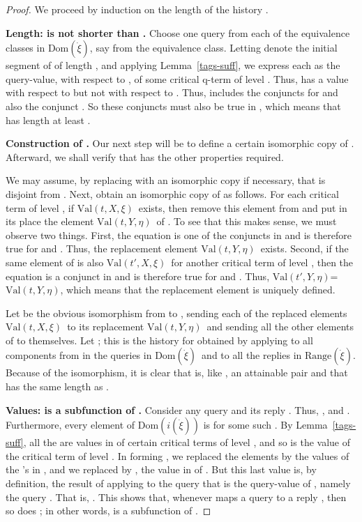 \documentclass{LMCS}
\theoremstyle{definition}
\newcommand{\ans}{\dot}
\newcommand{\dom}[1]{\ensuremath{{\text{Dom}}(#1)}}
\newcommand{\ran}[1]{\ensuremath{{\text{Range}}(#1)}}
\newcommand{\val}[3]{\ensuremath{\text{Val}(#1,#2,#3)}}
\begin{document}
\begin{proof}
We proceed by induction on the length  of the history .

\smallskip\noindent\textbf{Length:  is not shorter than .}
Choose one query from each of the  equivalence classes in
\dom{\ans\xi}, say  from the  equivalence class.  Letting
 denote the initial segment of  of length , and
applying Lemma~\ref{tags-suff}, we express each  as the query-value,
with respect to , of some critical q-term  of level
.  Thus,  has a value  with respect to
 but not with respect to .  Thus,
 includes the conjuncts  for
 and also the conjunct .  So these conjuncts
must also be true in , which means that  has length at
least .

\medskip\noindent\textbf{Construction of .} Our next
step will be to define a certain isomorphic copy  of
.  Afterward, we shall verify that  has the other
properties required.

 We may assume, by replacing  with an isomorphic copy if
necessary, that  is disjoint from .  Next, obtain an isomorphic
copy  of  as follows.  For each critical term  of level , if \val tX\xi\ exists, then remove this element from  and put
in its place the element \val tY\eta\ of .  To see that this makes
sense, we must observe two things.  First, the equation  is one
of the conjuncts in  and is therefore true for  and
.  Thus, the replacement element \val tY\eta\ exists.  Second,
if the same element of  is also \val{t'}X\xi\ for another critical
term  of level , then the equation  is a conjunct in
 and is therefore true for  and .  Thus,
\val{t'}Y\eta=\val tY\eta, which means that the replacement element is
uniquely defined.

Let  be the obvious isomorphism from  to , sending each of
the replaced elements \val tX\xi\ to its replacement \val tY\eta\ and
sending all the other elements of  to themselves.  Let
; this is the history for  obtained by applying  to
all components from  in the queries in \dom{\ans\xi}\ and to all the
replies in \ran{\ans\xi}.  Because of the isomorphism, it is clear
that  is, like , an attainable pair and that
 has the same length  as .

\medskip\noindent\textbf{Values:  is a subfunction of .}  Consider any query 
and its reply .  Thus, , and
.  Furthermore, every element of
\dom{i(\ans\xi)} is  for some such .  By
Lemma~\ref{tags-suff}, all the  are values in  of
certain critical terms  of level , and so  is the value of
the critical term  of level .  In forming
, we replaced the elements  by the values  of the
's in , and we replaced  by , the value in
 of .  But this last value is, by
definition, the result of applying  to the query that is the
query-value of , namely the query .  That is, .  This
shows that, whenever  maps a query  to a reply
, then so does ; in other words,  is a
subfunction of .


\end{proof}
\end{document}
